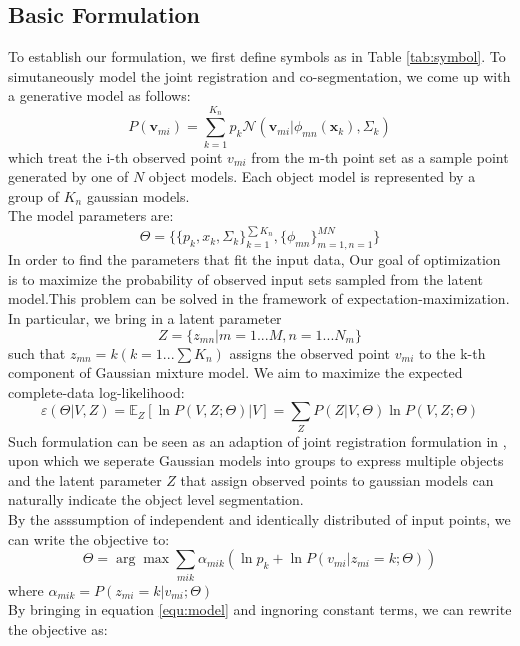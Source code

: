 \subsection{Basic Formulation}
To establish our formulation, we first define symbols as in Table \ref{tab:symbol}.
To simutaneously model the joint registration and co-segmentation,  we come up with a generative model as follows:
\begin{equation}
\label{equ:model}
P(\pmb{v}_{mi})=\sum^{K_n}_{k=1}p_k\mathcal{N}(\pmb{v}_{mi}|\phi_{mn}(\pmb{x}_k),\Sigma_k)
\end{equation}
which treat the i-th observed point $v_{mi}$ from the m-th point set as a sample point generated by one of $N$ object models.
Each object model is represented by a group of $K_n$ gaussian models.\\
The model parameters are:
$$\Theta=\{\{p_k,x_k,\Sigma_k\}_{k=1}^{\sum{K_n}},\{\phi_{mn}\}_{m=1,n=1}^{MN}\}$$
In order to find the parameters that fit the input data, 
Our goal of optimization is to maximize the probability of observed input sets sampled from the latent model.This problem can be solved in the framework of expectation-maximization. In particular, we bring in a latent parameter\\
$$Z=\{z_{mn}|m=1...M,n=1...N_m\}$$
such that $z_{mn}=k(k=1...\sum{K_n})$ assigns the observed point $v_{mi}$ to the k-th component of Gaussian mixture model. We aim to maximize the expected complete-data log-likelihood:
\begin{equation}
\label{equ:obj0}
\varepsilon(\Theta|V,Z)=\mathbb{E}_Z[\ln P(V,Z;\Theta)|V]={\sum_ZP(Z|V,\Theta)\ln{P(V,Z;\Theta)}}
\end{equation}
Such formulation can be seen as an adaption of joint registration formulation in \cite{Evangelidis2014}, upon which we seperate Gaussian models into groups to express multiple objects and the latent parameter  $Z$ that assign observed points to gaussian models can naturally indicate the object level segmentation.\\
By the asssumption of independent and identically distributed of input points, we can write the objective to:
\begin{equation}
\label{equ:obj2}
\Theta=\arg\max\sum_{mik}\alpha_{mik}(\ln p_k + \ln P(v_{mi}|z_{mi}=k;\Theta))
\end{equation}
where $\alpha_{mik} = P( z_{mi} = k | v_{mi} ; \Theta )$\\
By bringing in equation \ref{equ:model} and ingnoring constant terms, we can rewrite the objective as:
